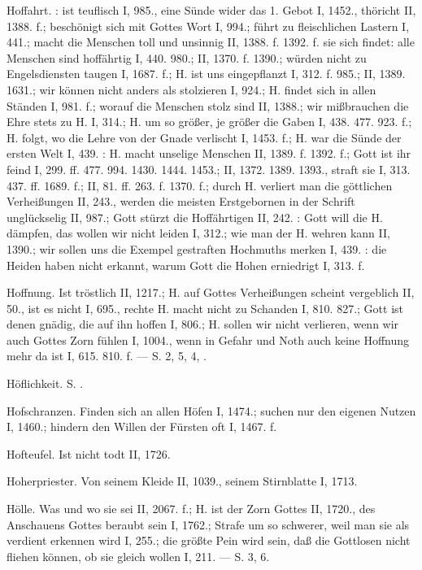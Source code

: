 Hoffahrt. : ist teuflisch I, 985., eine Sünde wider das 1. Gebot I, 1452., thöricht II, 1388. f.; beschönigt sich mit Gottes Wort I, 994.; führt zu fleischlichen Lastern I, 441.; macht die Menschen toll und unsinnig II, 1388. f. 1392. f.  sie sich findet: alle Menschen sind hoffährtig I, 440. 980.; II, 1370. f. 1390.; würden nicht zu Engelsdiensten taugen I, 1687. f.; H. ist uns eingepflanzt I, 312. f. 985.; II, 1389. 1631.; wir können nicht anders als stolzieren I, 924.; H. findet sich in allen Ständen I, 981. f.; worauf die Menschen stolz sind II, 1388.; wir mißbrauchen die Ehre stets zu H. I, 314.; H. um so größer, je größer die Gaben I, 438. 477. 923. f.; H. folgt, wo die Lehre von der Gnade verlischt I, 1453. f.; H. war die Sünde der ersten Welt I, 439. : H. macht unselige Menschen II, 1389. f. 1392. f.; Gott ist ihr feind I, 299. ff. 477. 994. 1430. 1444. 1453.; II, 1372. 1389. 1393., straft sie I, 313. 437. ff. 1689. f.; II, 81. ff. 263. f. 1370. f.; durch H. verliert man die göttlichen Verheißungen II, 243., werden die meisten Erstgebornen in der Schrift unglückselig II, 987.; Gott stürzt die Hoffährtigen II, 242. : Gott will die H. dämpfen, das wollen wir nicht leiden I, 312.; wie man der H. wehren kann II, 1390.; wir sollen uns die Exempel gestraften Hochmuths merken I, 439. : die Heiden haben nicht erkannt, warum Gott die Hohen erniedrigt I, 313. f.

Hoffnung. Ist tröstlich II, 1217.; H. auf Gottes Verheißungen scheint vergeblich II, 50., ist es nicht I, 695., rechte H. macht nicht zu Schanden I, 810. 827.; Gott ist denen gnädig, die auf ihn hoffen I, 806.; H. sollen wir nicht verlieren, wenn wir auch Gottes Zorn fühlen I, 1004., wenn in Gefahr und Noth auch keine Hoffnung mehr da ist I, 615. 810. f. — S.  2,  5,  4, .

Höflichkeit. S. .

Hofschranzen. Finden sich an allen Höfen I, 1474.; suchen nur den eigenen Nutzen I, 1460.; hindern den Willen der Fürsten oft I, 1467. f.

Hofteufel. Ist nicht todt II, 1726.

Hoherpriester. Von seinem Kleide II, 1039., seinem Stirnblatte I, 1713.

Hölle. Was und wo sie sei II, 2067. f.; H. ist der Zorn Gottes II, 1720., des Anschauens Gottes beraubt sein I, 1762.; Strafe um so schwerer, weil man sie als verdient erkennen wird I, 255.; die größte Pein wird sein, daß die Gottlosen nicht fliehen können, ob sie gleich wollen I, 211. — S.  3,  6.

